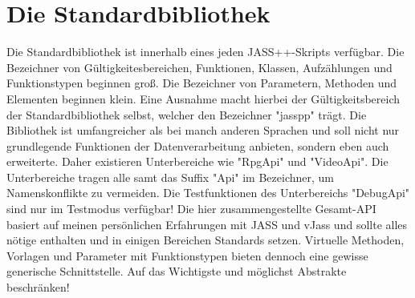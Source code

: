 \chapter { Die Standardbibliothek }

Die Standardbibliothek ist innerhalb eines jeden JASS++-Skripts verfügbar.
Die Bezeichner von Gültigkeitesbereichen, Funktionen, Klassen, Aufzählungen und Funktionstypen beginnen groß. Die Bezeichner von Parametern, Methoden und Elementen
beginnen klein.
Eine Ausnahme macht hierbei der Gültigkeitsbereich der Standardbibliothek selbst, welcher den Bezeichner "jasspp" trägt.
Die Bibliothek ist umfangreicher als bei manch anderen Sprachen und soll nicht nur grundlegende Funktionen der Datenverarbeitung anbieten, sondern eben auch
erweiterte.
Daher existieren Unterbereiche wie "RpgApi" und "VideoApi".
Die Unterbereiche tragen alle samt das Suffix "Api" im Bezeichner, um Namenskonflikte zu vermeiden.
Die Testfunktionen des Unterbereichs "DebugApi" sind nur im Testmodus verfügbar!
Die hier zusammengestellte Gesamt-API basiert auf meinen persönlichen Erfahrungen mit JASS und vJass und sollte alles nötige enthalten und in einigen Bereichen
Standards setzen. Virtuelle Methoden, Vorlagen und Parameter mit Funktionstypen bieten dennoch eine gewisse generische Schnittstelle.
Auf das Wichtigste und möglichst Abstrakte beschränken!

